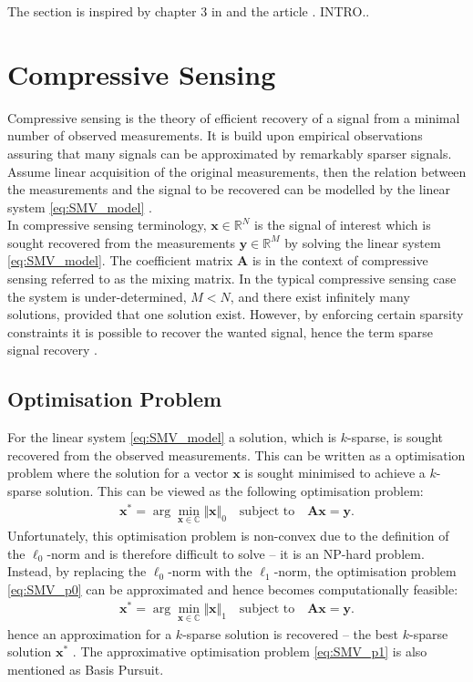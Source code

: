 The section is inspired by chapter 3 in \cite{phd2015} and the article \cite{Balkan2015}. INTRO.. 


\section{Compressive Sensing}\label{sec:CS}
Compressive sensing is the theory of efficient recovery of a signal from a minimal number of observed measurements. 
It is build upon empirical observations assuring that many signals can be approximated by remarkably sparser signals.   
Assume linear acquisition of the original measurements, then the relation between the measurements and the signal to be recovered can be modelled by the linear system \eqref{eq:SMV_model} \cite{FR}.  
\\ 
In compressive sensing terminology, $\mathbf{x} \in \mathbb{R}^N$ is the signal of interest which is sought recovered from the measurements $\mathbf{y} \in \mathbb{R}^M$ by solving the linear system \eqref{eq:SMV_model}. 
The coefficient matrix $\mathbf{A}$ is in the context of compressive sensing referred to as the mixing matrix.  
In the typical compressive sensing case the system is under-determined, $M < N$,  and there exist infinitely many solutions, provided that one solution exist.
However, by enforcing certain sparsity constraints it is possible to recover the wanted signal, hence the term sparse signal recovery \cite{FR}.

\subsection{Optimisation Problem}\label{sec:opti}
For the linear system \eqref{eq:SMV_model} a solution, which is $k$-sparse, is sought recovered from the observed measurements. This can be written as a optimisation problem where the solution for a vector $\mathbf{x}$ is sought minimised to achieve a $k$-sparse solution.
This can be viewed as the following optimisation problem:
\begin{align}\label{eq:SMV_p0}
\mathbf{x}^\ast = \arg \min_{\mathbf{x} \in \mathbb{C}} \Vert \mathbf{x} \Vert_0 \quad \text{subject to} \quad \mathbf{Ax} = \mathbf{y}.
\end{align}
Unfortunately, this optimisation problem is non-convex due to the definition of the $\ell_0$-norm and is therefore difficult to solve -- it is an NP-hard problem. 
Instead, by replacing the $\ell_0$-norm with the $\ell_1$-norm, the optimisation problem \eqref{eq:SMV_p0} can be approximated and hence becomes computationally feasible: 
\begin{align}\label{eq:SMV_p1}
\mathbf{x}^\ast = \arg \min_{\mathbf{x} \in \mathbb{C}} \Vert \mathbf{x} \Vert_1 \quad \text{subject to} \quad \mathbf{Ax} = \mathbf{y}.
\end{align} 
hence an approximation for a $k$-sparse solution is recovered -- the best $k$-sparse solution $\mathbf{x}^\ast$ \cite[p. 27]{CS}. The approximative optimisation problem \eqref{eq:SMV_p1} is also mentioned as Basis Pursuit. 


